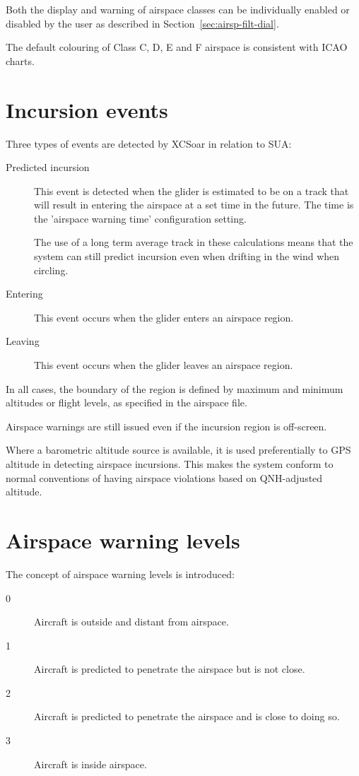 \documentclass[a4paper,12pt]{refrep}
\begin{document}
Both the display and warning of airspace classes can be individually
enabled or disabled by the user as described in
Section~\ref{sec:airsp-filt-dial}.

The default colouring of Class C, D, E and F airspace is consistent
with ICAO charts.

\section{Incursion events}

Three types of events are detected by XCSoar in relation to SUA:
\begin{description}
\item[Predicted incursion] This event is detected when the glider is estimated
to be on a track that will result in entering the airspace at a set
time in the future.  The time is the 'airspace warning time'
configuration setting.

The use of a long term average track in these calculations means that
the system can still predict incursion even when drifting in the wind
when circling.


\item[Entering] This event occurs when the glider enters an airspace region.
\item[Leaving] This event occurs when the glider leaves an airspace region.
\end{description}
In all cases, the boundary of the region is defined by maximum and
minimum altitudes or flight levels, as specified in the airspace file.

Airspace warnings are still issued even if the incursion region is
off-screen.

Where a barometric altitude source is available, it is used
preferentially to GPS altitude in detecting airspace incursions.  This
makes the system conform to normal conventions of having airspace
violations based on QNH-adjusted altitude.

\section{Airspace warning levels}

The concept of airspace warning levels is introduced:
\begin{description}
\item[0] Aircraft is outside and distant from airspace.
\item[1] Aircraft is predicted to penetrate the airspace but is not close.
\item[2] Aircraft is predicted to penetrate the airspace and is close to doing so.
\item[3] Aircraft is inside airspace.
\end{description}
\end{document}
